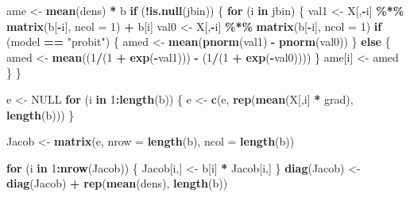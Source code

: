 \documentclass[
  12pt,
]{article}
\newenvironment{Shaded}{\begin{snugshade}}{\end{snugshade}}
\newcommand{\ControlFlowTok}[1]{\textcolor[rgb]{0.13,0.29,0.53}{\textbf{#1}}}
\newcommand{\DataTypeTok}[1]{\textcolor[rgb]{0.13,0.29,0.53}{#1}}
\newcommand{\DecValTok}[1]{\textcolor[rgb]{0.00,0.00,0.81}{#1}}
\newcommand{\KeywordTok}[1]{\textcolor[rgb]{0.13,0.29,0.53}{\textbf{#1}}}
\newcommand{\NormalTok}[1]{#1}
\newcommand{\OperatorTok}[1]{\textcolor[rgb]{0.81,0.36,0.00}{\textbf{#1}}}
\newcommand{\OtherTok}[1]{\textcolor[rgb]{0.56,0.35,0.01}{#1}}
\newcommand{\StringTok}[1]{\textcolor[rgb]{0.31,0.60,0.02}{#1}}
\begin{document}
\begin{Shaded}
\begin{Highlighting}[]
\NormalTok{  ame \textless{}{-}}\StringTok{ }\KeywordTok{mean}\NormalTok{(dens) }\OperatorTok{*}\StringTok{ }\NormalTok{b}
  \ControlFlowTok{if}\NormalTok{ (}\OperatorTok{!}\KeywordTok{is.null}\NormalTok{(jbin)) \{}
    \ControlFlowTok{for}\NormalTok{ (i }\ControlFlowTok{in}\NormalTok{ jbin) \{}
\NormalTok{      val1 \textless{}{-}}\StringTok{ }\NormalTok{X[,}\OperatorTok{{-}}\NormalTok{i] }\OperatorTok{\%*\%}\StringTok{ }\KeywordTok{matrix}\NormalTok{(b[}\OperatorTok{{-}}\NormalTok{i], }\DataTypeTok{ncol =} \DecValTok{1}\NormalTok{) }\OperatorTok{+}\StringTok{ }\NormalTok{b[i]}
\NormalTok{      val0 \textless{}{-}}\StringTok{ }\NormalTok{X[,}\OperatorTok{{-}}\NormalTok{i] }\OperatorTok{\%*\%}\StringTok{ }\KeywordTok{matrix}\NormalTok{(b[}\OperatorTok{{-}}\NormalTok{i], }\DataTypeTok{ncol =} \DecValTok{1}\NormalTok{)}
      \ControlFlowTok{if}\NormalTok{ (model }\OperatorTok{==}\StringTok{ "probit"}\NormalTok{) \{}
\NormalTok{        amed \textless{}{-}}\StringTok{ }\KeywordTok{mean}\NormalTok{(}\KeywordTok{pnorm}\NormalTok{(val1) }\OperatorTok{{-}}\StringTok{ }\KeywordTok{pnorm}\NormalTok{(val0))}
\NormalTok{      \} }\ControlFlowTok{else}\NormalTok{ \{ }
\NormalTok{        amed \textless{}{-}}\StringTok{ }\KeywordTok{mean}\NormalTok{((}\DecValTok{1}\OperatorTok{/}\NormalTok{(}\DecValTok{1} \OperatorTok{+}\StringTok{ }\KeywordTok{exp}\NormalTok{(}\OperatorTok{{-}}\NormalTok{val1))) }\OperatorTok{{-}}\StringTok{ }\NormalTok{(}\DecValTok{1}\OperatorTok{/}\NormalTok{(}\DecValTok{1} \OperatorTok{+}\StringTok{ }\KeywordTok{exp}\NormalTok{(}\OperatorTok{{-}}\NormalTok{val0))))}
\NormalTok{      \}}
\NormalTok{      ame[i] \textless{}{-}}\StringTok{ }\NormalTok{amed}
\NormalTok{    \}}
\NormalTok{  \}}

\NormalTok{  e \textless{}{-}}\StringTok{ }\OtherTok{NULL}
  \ControlFlowTok{for}\NormalTok{ (i }\ControlFlowTok{in} \DecValTok{1}\OperatorTok{:}\KeywordTok{length}\NormalTok{(b)) \{}
\NormalTok{    e \textless{}{-}}\StringTok{ }\KeywordTok{c}\NormalTok{(e, }\KeywordTok{rep}\NormalTok{(}\KeywordTok{mean}\NormalTok{(X[,i] }\OperatorTok{*}\StringTok{ }\NormalTok{grad), }\KeywordTok{length}\NormalTok{(b)))}
\NormalTok{  \}}

\NormalTok{  Jacob \textless{}{-}}\StringTok{ }\KeywordTok{matrix}\NormalTok{(e, }\DataTypeTok{nrow =} \KeywordTok{length}\NormalTok{(b), }\DataTypeTok{ncol =} \KeywordTok{length}\NormalTok{(b))}

  \ControlFlowTok{for}\NormalTok{ (i }\ControlFlowTok{in} \DecValTok{1}\OperatorTok{:}\KeywordTok{nrow}\NormalTok{(Jacob)) \{}
\NormalTok{    Jacob[i,] \textless{}{-}}\StringTok{ }\NormalTok{b[i] }\OperatorTok{*}\StringTok{ }\NormalTok{Jacob[i,]}
\NormalTok{  \}}
  \KeywordTok{diag}\NormalTok{(Jacob) \textless{}{-}}\StringTok{ }\KeywordTok{diag}\NormalTok{(Jacob) }\OperatorTok{+}\StringTok{ }\KeywordTok{rep}\NormalTok{(}\KeywordTok{mean}\NormalTok{(dens), }\KeywordTok{length}\NormalTok{(b))}


\end{Highlighting}
\end{Shaded}
\end{document}
